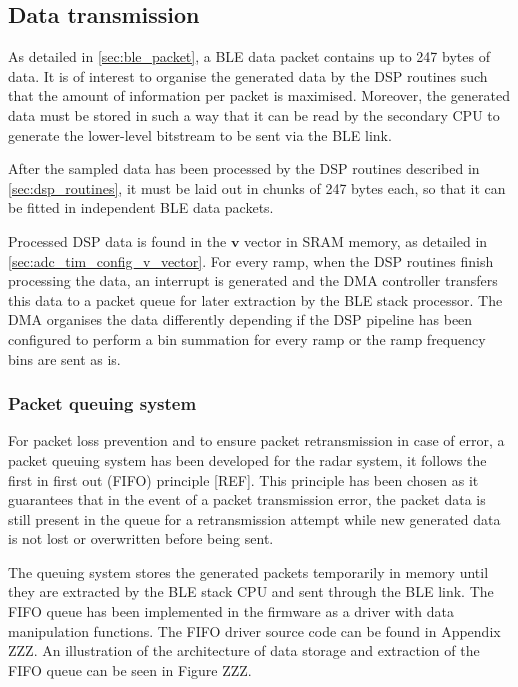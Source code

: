 \subsection{Data transmission} \label{sec:data_transmission}

As detailed in \cref{sec:ble_packet}, a BLE data packet contains up to 247 bytes of data. It is of interest to organise the generated data by the DSP routines such that the amount of information per packet is maximised. Moreover, the generated data must be stored in such a way that it can be read by the secondary CPU to generate the lower-level bitstream to be sent via the BLE link.

After the sampled data has been processed by the DSP routines described in \cref{sec:dsp_routines}, it must be laid out in chunks of 247 bytes each, so that it can be fitted in independent BLE data packets.

Processed DSP data is found in the $\mathbf{v}$ vector in SRAM memory, as detailed in \cref{sec:adc_tim_config_v_vector}. For every ramp, when the DSP routines finish processing the data, an interrupt is generated and the DMA controller transfers this data to a packet queue for later extraction by the BLE stack processor. The DMA organises the data differently depending if the DSP pipeline has been configured to perform a bin summation for every ramp or the ramp frequency bins are sent as is.

\subsubsection{Packet queuing system}

For packet loss prevention and to ensure packet retransmission in case of error, a packet queuing system has been developed for the radar system, it follows the first in first out (FIFO) principle [REF]. This principle has been chosen as it guarantees that in the event of a packet transmission error, the packet data is still present in the queue for a retransmission attempt while new generated data is not lost or overwritten before being sent.

The queuing system stores the generated packets temporarily in memory until they are extracted by the BLE stack CPU and sent through the BLE link. The FIFO queue has been implemented in the firmware as a driver with data manipulation functions. The FIFO driver source code can be found in Appendix ZZZ. An illustration of the architecture of data storage and extraction of the FIFO queue can be seen in Figure ZZZ.

